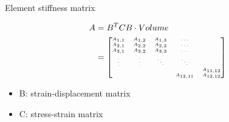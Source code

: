 \documentclass[screen]{beamer}
\begin{document}
\begin{frame}
Element stiffness matrix

\begin{align*}
A &= B^T C B \cdot Volume \\
 &= \tiny
\begin{bmatrix}
A_{1,1} & A_{1,2} & A_{1,3} &\hdots & \\
A_{2,1} & A_{2,2} & A_{2,3} &\hdots & \\
A_{3,1} & A_{3,2} & A_{3,3} &\hdots & \\
\vdots & \vdots & \ddots & \ddots & \\
& & & & A_{11,12} \\
 & & & A_{12,11} & A_{12,12}
\end{bmatrix}  
\end{align*}
\begin{itemize}
\item B: strain-displacement matrix
\item C: stress-strain matrix
\end{itemize}
\end{frame}

\end{document}

